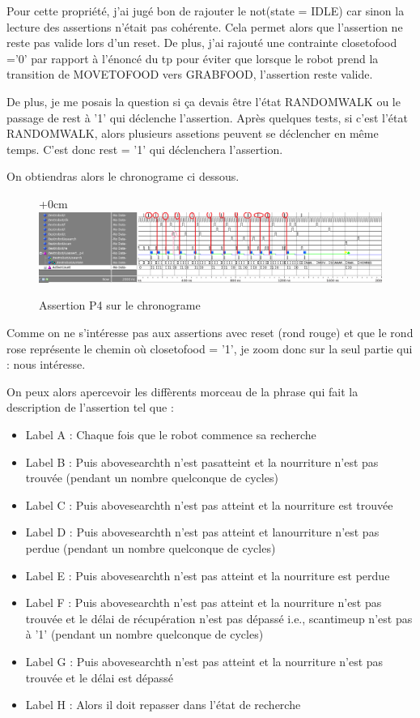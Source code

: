 \documentclass{article}
\newcommand{\sautligne}{
\textbf{\vspace{5mm}}
}
\begin{document}
Pour cette propriété, j'ai jugé bon de rajouter le not(state = IDLE) car sinon la lecture des assertions n'était pas cohérente. Cela permet alors que l'assertion ne reste pas valide lors d'un reset. 
De plus, j'ai rajouté une contrainte closetofood ='0' par rapport à l'énoncé du tp pour éviter que lorsque le robot prend la transition de MOVETOFOOD vers GRABFOOD, l'assertion reste valide.
\sautligne

De plus, je me posais la question si ça devais être l'état RANDOMWALK ou le passage de rest à '1' qui déclenche l'assertion. Après quelques tests, si c'est l'état RANDOMWALK, alors plusieurs assetions peuvent se déclencher en même temps. C'est donc rest = '1' qui déclenchera l'assertion.

On obtiendras alors le chronograme ci dessous. 

\begin{figure}[!h]
\advance\leftskip+0cm
\includegraphics[scale=0.6]{PSL/P4-1.PNG}
\caption{Assertion P4 sur le chronograme }
\end{figure}

Comme on ne s'intéresse pas aux assertions avec reset (rond rouge) et que le rond rose représente le chemin où closetofood = '1', je zoom donc sur la seul partie qui : nous intéresse.

On peux alors apercevoir les diffèrents morceau de la phrase qui fait la description de l'assertion tel que :
\begin{itemize}
\item Label A : Chaque fois que le robot commence sa recherche
\item Label B : Puis abovesearchth n'est pasatteint et la nourriture n'est pas trouvée (pendant un nombre quelconque de cycles)
\item Label C : Puis abovesearchth n'est pas atteint et la nourriture est trouvée
\item Label D : Puis abovesearchth n'est pas atteint et lanourriture n'est pas perdue (pendant un nombre quelconque de cycles)
\item Label E : Puis abovesearchth n'est pas atteint et la nourriture est perdue
\item Label F : Puis abovesearchth n'est pas atteint et la nourriture n'est pas trouvée et le délai de récupération n'est pas dépassé i.e., scantimeup n'est pas à '1' (pendant un
nombre quelconque de cycles)

\item Label G :  Puis abovesearchth n'est pas atteint et la nourriture n'est pas trouvée
et le délai est dépassé 

\item Label H : Alors il doit repasser dans l'état de recherche


\end{itemize}
\end{document}
